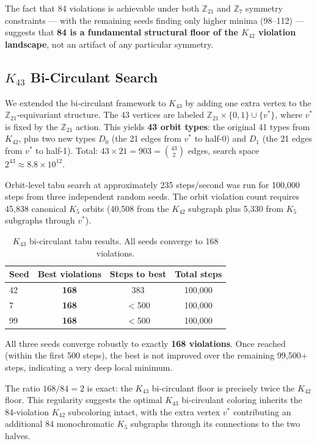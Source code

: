 \documentclass[11pt]{article}
\begin{document}
The fact that 84 violations is achievable under both $\mathbb{Z}_{21}$ and
$\mathbb{Z}_7$ symmetry constraints --- with the remaining seeds finding only
higher minima (98--112) --- suggests that \textbf{84 is a fundamental structural
floor of the $K_{42}$ violation landscape}, not an artifact of any particular
symmetry.

\subsection{$K_{43}$ Bi-Circulant Search}
\label{sec:k43bicirculant}

We extended the bi-circulant framework to $K_{43}$ by adding one extra vertex
to the $\mathbb{Z}_{21}$-equivariant structure.
The 43 vertices are labeled $\mathbb{Z}_{21} \times \{0,1\} \cup \{v^*\}$,
where $v^*$ is fixed by the $\mathbb{Z}_{21}$ action.
This yields \textbf{43 orbit types}: the original 41 types from $K_{42}$,
plus two new types $D_0$ (the 21 edges from $v^*$ to half-0) and $D_1$
(the 21 edges from $v^*$ to half-1).
Total: $43 \times 21 = 903 = \binom{43}{2}$ edges, search space $2^{43} \approx 8.8 \times 10^{12}$.

Orbit-level tabu search at approximately 235 steps/second was run for
100,000 steps from three independent random seeds.
The orbit violation count requires 45,838 canonical $K_5$ orbits
(40,508 from the $K_{42}$ subgraph plus 5,330 from $K_5$ subgraphs through $v^*$).

\begin{table}[h]
\centering
\begin{tabular}{lccc}
\toprule
Seed & Best violations & Steps to best & Total steps \\
\midrule
42 & \textbf{168} & 383     & 100,000 \\
7  & \textbf{168} & $<$500  & 100,000 \\
99 & \textbf{168} & $<$500  & 100,000 \\
\bottomrule
\end{tabular}
\caption{$K_{43}$ bi-circulant tabu results. All seeds converge to 168 violations.}
\label{tab:k43bicirculant}
\end{table}

All three seeds converge robustly to exactly \textbf{168 violations}.
Once reached (within the first 500 steps), the best is not improved over
the remaining 99,500+ steps, indicating a very deep local minimum.

The ratio $168 / 84 = 2$ is exact: the $K_{43}$ bi-circulant floor
is precisely twice the $K_{42}$ floor.
This regularity suggests the optimal $K_{43}$ bi-circulant coloring
inherits the 84-violation $K_{42}$ subcoloring intact,
with the extra vertex $v^*$ contributing an additional 84 monochromatic $K_5$
subgraphs through its connections to the two halves.
\end{document}
